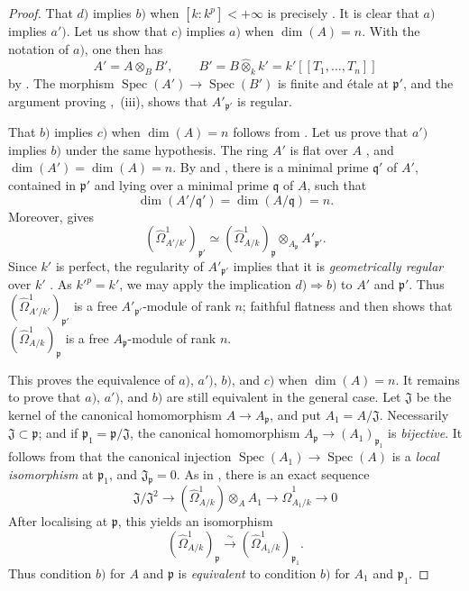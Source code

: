 \begin{proof}
That $d)$ implies $b)$ when $[k:k^p]<+\infty$ is precisely . It is clear that $a)$ implies $a')$. Let us show that $c)$ implies $a)$ when $\dim(A)=n$. With the notation of $a)$, one then has
\[
  A'=A\otimes_{B}B',
  \qquad
  B'=B\widehat{\otimes}_kk'=k'[[T_1,\ldots,T_n]]
\]
by . The morphism $\operatorname{Spec}(A')\to\operatorname{Spec}(B')$ is finite and \'etale at $\mathfrak p'$, and the argument proving ,~(iii), shows that $A'_{\mathfrak p'}$ is regular.

That $b)$ implies $c)$ when $\dim(A)=n$ follows from . Let us prove that $a')$ implies $b)$ under the same hypothesis. The ring $A'$ is flat over $A$ , and $\dim(A')=\dim(A)=n$. By  and , there is a minimal prime $\mathfrak q'$ of $A'$, contained in $\mathfrak p'$ and lying over a minimal prime $\mathfrak q$ of $A$, such that
\[
  \dim(A'/\mathfrak q')=\dim(A/\mathfrak q)=n.
\]
Moreover,  gives
\[
  (\hat{\Omega}^1_{A'/k'})_{\mathfrak p'}
  \simeq(\hat{\Omega}^1_{A/k})_\mathfrak p
  \otimes_{A_\mathfrak p}A'_{\mathfrak p'}.
\]
Since $k'$ is perfect, the regularity of $A'_{\mathfrak p'}$ implies that it is \emph{geometrically regular} over $k'$ . As $k'^p=k'$, we may apply the implication $d)\Rightarrow b)$ to $A'$ and $\mathfrak p'$. Thus $(\hat{\Omega}^1_{A'/k'})_{\mathfrak p'}$ is a free $A'_{\mathfrak p'}$-module of rank $n$; faithful flatness  and  then shows that $(\hat{\Omega}^1_{A/k})_\mathfrak p$ is a free $A_\mathfrak p$-module of rank $n$.

This proves the equivalence of $a)$, $a')$, $b)$, and $c)$ when $\dim(A)=n$.
It remains to prove that $a)$, $a')$, and $b)$ are still equivalent in the general case.
Let $\mathfrak J$ be the kernel of the canonical homomorphism $A\to A_\mathfrak p$, and put $A_1=A/\mathfrak J$. Necessarily $\mathfrak J\subset\mathfrak p$; and if $\mathfrak p_1=\mathfrak p/\mathfrak J$, the canonical homomorphism $A_\mathfrak p\to(A_1)_{\mathfrak p_1}$ is \emph{bijective}. It follows from  that the canonical injection $\operatorname{Spec}(A_1)\to\operatorname{Spec}(A)$ is a \emph{local isomorphism} at $\mathfrak p_1$, and $\mathfrak J_\mathfrak p=0$. As in , there is an exact sequence
\[
  \mathfrak J/\mathfrak J^2
  \longrightarrow (\hat{\Omega}^1_{A/k})\otimes_{A}A_1
  \longrightarrow \hat{\Omega}^1_{A_1/k}\longrightarrow0
\]
After localising at $\mathfrak p$, this yields an isomorphism
\[
  (\hat{\Omega}^1_{A/k})_\mathfrak p
  \xrightarrow{\sim}
  (\hat{\Omega}^1_{A_1/k})_{\mathfrak p_1}.
\]
Thus condition $b)$ for $A$ and $\mathfrak p$ is \emph{equivalent} to condition $b)$ for $A_1$ and $\mathfrak p_1$.


\end{proof}
